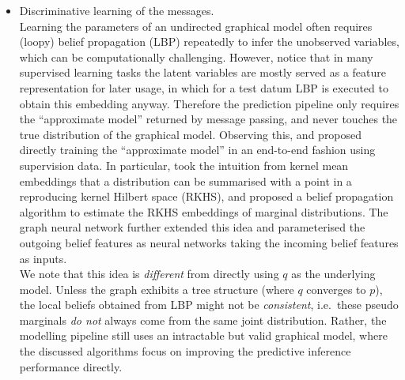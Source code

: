 \begin{itemize}
\item Discriminative learning of the messages. \\
Learning the parameters of an undirected graphical model often requires (loopy) belief propagation (LBP) repeatedly to infer the unobserved variables, which can be computationally challenging. However, notice that in many supervised learning tasks the latent variables are mostly served as a feature representation for later usage, in which for a test datum LBP is executed to obtain this embedding anyway. Therefore the prediction pipeline only requires the ``approximate model'' returned by message passing, and never touches the true distribution of the graphical model. Observing this, \cite{zheng:crf_rnn2015} and \cite{dai:embed_infer2016} proposed directly training the ``approximate model'' in an end-to-end fashion using supervision data. In particular, \cite{song:kbp2011} took the intuition from kernel mean embeddings \citep{smola:kernel_embedding2007} that a distribution can be summarised with a point in a reproducing kernel Hilbert space (RKHS), and proposed a belief propagation algorithm to estimate the RKHS embeddings of marginal distributions. The graph neural network \citep{gori:graph2005, scarselli:graph2009, li:gated2015, dai:embed_infer2016} further extended this idea and parameterised the outgoing belief features as neural networks taking the incoming belief features as inputs. \\
%
We note that this idea is \emph{different} from directly using $q$ as the underlying model. Unless the graph exhibits a tree structure (where $q$ converges to $p$), the local beliefs obtained from LBP might not be \emph{consistent}, i.e.~these pseudo marginals \emph{do not} always come from the same joint distribution. Rather, the modelling pipeline still uses an intractable but valid graphical model, where the discussed algorithms focus on improving the predictive inference performance directly.

\end{itemize}
